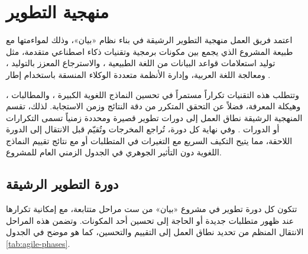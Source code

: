 \section{منهجية التطوير}
\label{sec:methodology}

اعتمد فريق العمل منهجية التطوير الرشيقة  \cite{schwaber2020scrum} في بناء نظام «بيان»، وذلك
لمواءمتها مع طبيعة المشروع الذي يجمع بين مكونات برمجية وتقنيات ذكاء اصطناعي
متقدمة، مثل توليد استعلامات قواعد البيانات من اللغة الطبيعية ،
والاسترجاع المعزز بالتوليد ، ومعالجة اللغة العربية، وإدارة الأنظمة
متعددة الوكلاء المنسقة باستخدام إطار .

وتتطلب هذه التقنيات تكراراً مستمراً في تحسين النماذج اللغوية الكبيرة
، والمطالبات ، وهيكلة المعرفة، فضلاً عن التحقق المتكرر
من دقة النتائج وزمن الاستجابة. لذلك، تقسم المنهجية الرشيقة نطاق العمل إلى
دورات تطوير قصيرة ومحددة زمنياً تسمى التكرارات أو الدورات .
وفي نهاية كل دورة، تُراجع المخرجات وتُقيّم قبل الانتقال إلى الدورة اللاحقة،
مما يتيح التكيف السريع مع التغيرات في المتطلبات أو مع نتائج تقييم النماذج
اللغوية دون التأثير الجوهري في الجدول الزمني العام للمشروع.

\subsection{دورة التطوير الرشيقة}
\label{subsec:agile-lifecycle}

تتكون كل دورة تطوير في مشروع «بيان» من ست مراحل متتابعة، مع إمكانية تكرارها
عند ظهور متطلبات جديدة أو الحاجة إلى تحسين أحد المكونات. وتضمن هذه المراحل
الانتقال المنظم من تحديد نطاق العمل إلى التقييم والتحسين، كما هو موضح في
الجدول \ref{tab:agile-phases}.

